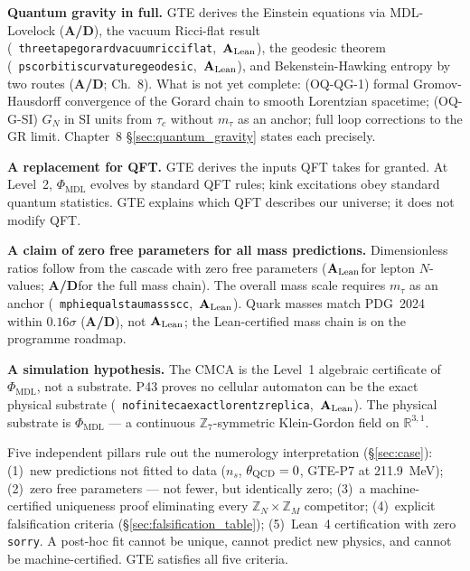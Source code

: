 \documentclass[11pt,openany]{book}
\theoremstyle{remark}
\newcommand{\PHIMDL}{\Phi_{\mathrm{MDL}}}
\newcommand{\ZS}{\mathbb{Z}_7}
\newcommand{\lean}[1]{%
  \penalty-100
  \begingroup\def\_{\textunderscore\allowbreak}\texttt{#1}\endgroup}
\newcommand{\GN}{G_N}
\newcommand{\CatAL}{\ensuremath{\textbf{A}_{\rm Lean}}}
\newcommand{\CatAD}{\textbf{A/D}}
\begin{document}
\begin{tcolorbox}[colback=yellow!8,colframe=yellow!60!black,
  title={Claim Boundary~D: What GTE Does NOT Claim}]
\textbf{Quantum gravity in full.}  GTE derives the Einstein equations via MDL-Lovelock (\CatAD), the vacuum Ricci-flat result \mbox{(\lean{three\_tape\_gorard\_vacuum\_ricci\_flat}, \CatAL)}, the geodesic theorem \mbox{(\lean{psc\_orbit\_is\_curvature\_geodesic}, \CatAL)}, and Bekenstein-Hawking entropy by two routes (\CatAD; Ch.~8).  What is not yet complete:
(OQ-QG-1) formal Gromov-Hausdorff convergence of the Gorard chain to smooth Lorentzian
spacetime; (OQ-G-SI) $\GN$ in SI units from $\tau_c$ without $m_\tau$ as an anchor;
full loop corrections to the GR limit.  Chapter~8 §\ref{sec:quantum_gravity} states each
precisely.

\textbf{A replacement for QFT.}  GTE derives the inputs QFT takes for granted.  At
Level~2, $\PHIMDL$ evolves by standard QFT rules; kink excitations obey standard quantum
statistics.  GTE explains which QFT describes our universe; it does not modify QFT.

\textbf{A claim of zero free parameters for all mass predictions.}  Dimensionless ratios
follow from the cascade with zero free parameters (\CatAL for lepton $N$-values;
\CatAD for the full mass chain).  The overall mass scale requires $m_\tau$ as an anchor \mbox{(\lean{mphi\_equals\_tau\_mass\_scc}, \CatAL)}.  Quark masses match PDG~2024 within
$0.16\sigma$ (\CatAD), not \CatAL; the Lean-certified mass chain is on the programme
roadmap.

\textbf{A simulation hypothesis.}  The CMCA is the Level~1 algebraic certificate of
$\PHIMDL$, not a substrate.  P43 proves no cellular automaton can be the exact physical
substrate \mbox{(\lean{no\_finite\_ca\_exact\_lorentz\_replica}, \CatAL)}.  The physical
substrate is $\PHIMDL$ — a continuous $\ZS$-symmetric Klein-Gordon field on
$\mathbb{R}^{3,1}$.
\end{tcolorbox}

\begin{tcolorbox}[colback=yellow!8,colframe=yellow!60!black,
  title={Why This Is Not Numerology}]
Five independent pillars rule out the numerology interpretation (§\ref{sec:case}):
(1)~new predictions not fitted to data ($n_s$, $\theta_{\rm QCD}=0$, GTE-P7 at 211.9~MeV);
(2)~zero free parameters — not fewer, but identically zero;
(3)~a machine-certified uniqueness proof eliminating every $\mathbb{Z}_N\times\mathbb{Z}_M$
competitor;
(4)~explicit falsification criteria (§\ref{sec:falsification_table});
(5)~Lean~4 certification with zero \lean{sorry}.
A post-hoc fit cannot be unique, cannot predict new physics, and cannot be
machine-certified.  GTE satisfies all five criteria.
\end{tcolorbox}
\end{document}
